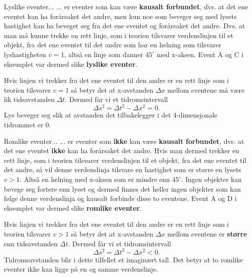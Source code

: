 \documentclass{beamer}
\newcommand{\pagebutton}[1]{\setbeamertemplate{button}{\tikz\node[inner xsep = 5pt, draw = structure!90, fill = green(ryb), rounded corners = 8pt]{\color{amber}\Large\insertbuttontext};}\beamerbutton{#1}}
\begin{document}
\begin{frame}
{
\begin{block}{Lyslike eventer...}
... er eventer som kan være {\bf kausalt forbundet}, dvs. at det ene eventet kan ha forårsaket det andre, men kun noe som beveger seg med lysets hastighet kan ha beveget seg fra det ene eventet og forårsaket det andre. Dvs. at man må kunne trekke en rett linje, som i teorien tilsvarer verdenslinjen til et objekt, fra det ene eventet til det andre som har en helning som tilsvarer lyshastigheten $v=1$, altså en linje som danner $45^\circ$ med x-aksen. Event A og C i eksemplet var dermed slike {\bf lyslike eventer}.
\end{block}
Hvis linjen vi trekker fra det ene eventet til den andre er en rett linje som i teorien tilsvarer $v=1$ så betyr det at x-avstanden $\Delta x$ mellom eventene må være lik tidsavstanden $\Delta t$. Dermed får vi et tidromsintervall
\[
\Delta s^2 = \Delta t^2 - \Delta x^2=0.
\]
Lys beveger seg slik at avstanden det tilbakelegger i det 4-dimensjonale tidrommet er 0.
\hyperlink{td8}{\pagebutton{SIDE 12/21/44}}}

{
\begin{block}{Romlike eventer...}
... er eventer som {\bf ikke} kan være {\bf kausalt forbundet}, dvs. at det ene eventet {\bf ikke} kan ha forårsaket det andre. Hvis man dermed trekker en rett linje, som i teorien tilsvarer verdenslinjen til et objekt, fra det ene eventet til det andre, så vil denne verdenslinja tilsvare en hastighet som er større en lysets $v>1$. Altså en helning med x-aksen som er mindre enn $45^\circ$. Ingen objekter kan bevege seg fortere enn lyset og dermed finnes det heller ingen objekter som kan følge denne verdenslinja og kausalt forbinde disse to eventene. Event A og D i eksemplet var dermed slike {\bf romlike eventer}.
\end{block}
Hvis linjen vi trekker fra det ene eventet til den andre er en rett linje som i teorien tilsvarer $v>1$ så betyr det at x-avstanden $\Delta x$ mellom eventene er {\bf større} enn tidsavstanden $\Delta t$. Dermed får vi et tidromsintervall
\[
\Delta s^2 = \Delta t^2 - \Delta x^2<0.
\]
Tidromsavstanden blir i dette tilfellet et imaginært tall. Det betyr at to romlike eventer ikke kan ligge på en og samme verdenslinje.
\hyperlink{td9}{\pagebutton{SIDE 13/21/44}}}



\end{frame}
\end{document}
